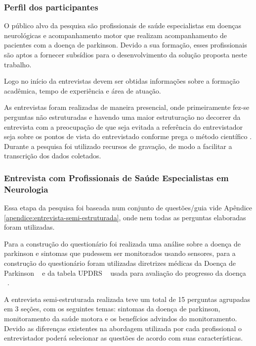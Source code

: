 \subsubsection{Perfil dos participantes}

O público alvo da pesquisa são profissionais de saúde especialistas em doenças neurológicas e acompanhamento motor que realizam acompanhamento de pacientes com a doença de parkinson. Devido a sua formação, esses profissionais são aptos a fornecer subsídios para o desenvolvimento da solução proposta neste trabalho.

Logo no início da entrevistas devem ser obtidas informações sobre a formação acadêmica, tempo de experiência e área de atuação.



As entrevistas foram realizadas de maneira presencial, onde primeiramente fez-se perguntas não estruturadas e havendo uma maior estruturação no decorrer da entrevista com a preocupação de que seja evitada a referência do entrevistador seja sobre os pontos de vista do entrevistado conforme prega o método científico \cite{FLI04}. Durante a pesquisa foi utilizado recursos de gravação, de modo a facilitar a transcrição dos dados coletados. %

\subsubsection{Entrevista com Profissionais de Saúde Especialistas em Neurologia} 
Essa etapa da pesquisa foi baseada num conjunto de questões/guia vide Apêndice \ref{apendice:entrevista-semi-estruturada}, onde nem todas as perguntas elaboradas foram utilizadas.

Para a construção do questionário foi realizada uma análise sobre a doença de parkinson e sintomas que pudessem ser monitorados usando sensores, para a construção do questionário foram utilizadas diretrizes médicas da Doença de Parkinson ~\cite{protpar010,national2006parkinson} e da tabela UPDRS ~\cite{updrs87} usada para avaliação do progresso da doença ~\cite{updrs87}.

A entrevista semi-estruturada realizada teve um total de 15 perguntas agrupadas em 3 seções, com os seguintes temas: sintomas da doença de parkinson, monitoramento da saúde motora e os benefícios advindos do monitoramento. Devido as diferenças existentes na abordagem utilizada por cada profissional o entrevistador poderá selecionar as questões de acordo com suas características.

